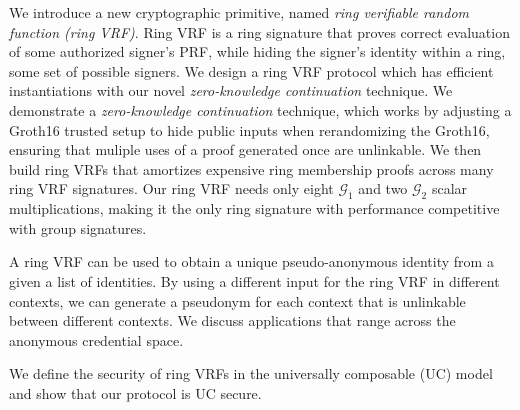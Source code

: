 
\def\eprintsmallskip{\smallskip}{}%
We introduce a new cryptographic primitive,  named
\emph{ring verifiable random function (ring VRF)}.
Ring VRF is a ring signature that proves correct evaluation
of some authorized signer's PRF, while hiding the signer's
identity within a ring, some set of possible signers. We design a ring VRF protocol which has efficient instantiations with our novel {\em zero-knowledge continuation} technique.
We demonstrate a {\em zero-knowledge continuation} technique,
which works by adjusting a Groth16 trusted setup to hide public inputs
when rerandomizing the Groth16, ensuring that muliple uses of a proof generated once are unlinkable.  We then build ring VRFs that amortizes
expensive ring membership proofs across many ring VRF signatures.
%
Our ring VRF needs only eight $\mathcal{G}_1$ and two
$\mathcal{G}_2$ scalar multiplications, making it the only ring signature
with performance competitive with group signatures.

A ring VRF can be used to obtain a unique pseudo-anonymous identity from a given a list of identities.
By using a different input for the ring VRF in different contexts, we can generate a pseudonym for each context that is unlinkable between different contexts. 
We discuss applications that range across the anonymous credential space.


We define the security of ring VRFs in the universally composable (UC) model and show that our protocol is UC secure.
